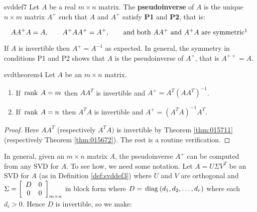 \begin{definition}{}{svddef7} 
Let $A$ be a real $m\times n$ matrix. The \textbf{pseudoinverse} of $A$ is the unique $n\times m$ matrix $A^{+}$ such that $A$ and $A^{+}$ satisfy \textbf{P1} and \textbf{P2}, that is:

\begin{equation*}
AA^{+}A=A,\qquad A^{+}AA^{+}=A^{+},\qquad \mbox{and both } AA^{+} \mbox{ and } A^{+}A \mbox{ are symmetric}\footnotemark
\end{equation*}
\end{definition}

If $A$ is invertible then $A^{+}=A^{-1}$ as expected. In general, the
symmetry in conditions P1 and P2 shows that $A$ is the pseudoinverse of $A^{+}$, that is $A^{++}=A$. 

\newpage 
\begin{theorem}{}{svdtheorem4} 
Let $A$ be an $m\times n$ matrix.

\begin{enumerate}
\item If $\thinspace\operatorname{rank\medspace}A=m$ then $AA^{T}$ is invertible and $A^{+}=A^{T}(AA^{T})^{-1}$.

\item If $\thinspace\operatorname{rank\medspace}A=n$ then $A^{T}A$ is invertible and $A^{+}=(A^{T}A)^{-1}A^{T}$.
\end{enumerate}
\end{theorem}

\begin{proof}
Here $AA^{T}$ (respectively $A^{T}A)$ is
invertible by Theorem \ref{thm:015711} (respectively Theorem \ref{thm:015672}). The rest is a
routine verification.
\end{proof}

In general, given an $m\times n$ matrix $A$, the pseudoinverse $A^{+}$ can
be computed from any SVD for $A$. To see how, we need some notation. Let $A=U\Sigma V^{T}$ be an SVD for $A$ (as in Definition \ref{def:svddef3}) where $U$ and $V$ are orthogonal and $\Sigma =
\left[ 
\begin{array}{cc}
D & 0 \\ 
0 & 0
\end{array}
\right]_{m\times n}$ in block form where $D=\thinspace\operatorname{diag\medspace}(d_{1},d_{2},\ldots ,d_{r})$ where each $d_{i}>0$. Hence $D$ is
invertible, so we make:

